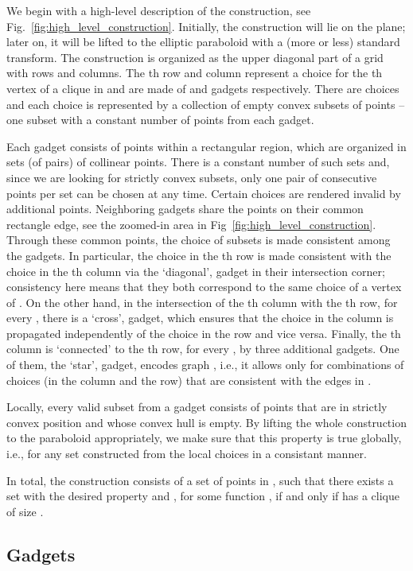 \documentclass[11pt,a4paper]{article}
\begin{document}
We begin with a high-level description of the construction, see Fig.~\ref{fig:high_level_construction}. Initially, the construction will lie on the plane; later on, it will be lifted to the elliptic paraboloid with a (more or less) standard transform. The construction is organized as the upper diagonal part of a grid with  rows and  columns. The th row and column represent a choice for the th vertex of a clique in  and are made of  and  gadgets respectively. There are  choices and each choice is represented by a collection of empty convex subsets of points -- one subset with a constant number of points from each gadget.

Each gadget consists of  points within a rectangular region, which are organized in sets (of pairs) of collinear points. There is a constant number of such sets and, since we are looking for strictly convex subsets, only one pair of consecutive points per set can be chosen at any time. Certain choices are rendered invalid by additional points. Neighboring gadgets share the points on their common rectangle edge, see the zoomed-in area in Fig~\ref{fig:high_level_construction}. Through these common points, the choice of subsets is made consistent among the gadgets. In particular, the choice in the th row is made consistent with the choice in the th column via the `diagonal',  gadget in their intersection corner; consistency here means that they both correspond to the same choice of a vertex of . On the other hand, in the intersection of the th column with the th row, for every , there is a `cross',  gadget, which ensures that the choice in the column is propagated independently of the choice in the row and vice versa. 
Finally, the th column is `connected' to the th row, for every , by three additional gadgets. One of them, the `star',  gadget, encodes graph , i.e., it allows only for combinations of choices (in the column and the row) that are consistent with the edges in .

Locally, every valid subset from a gadget consists of points that are in strictly convex position and whose convex hull is empty. By lifting the whole construction to the paraboloid appropriately, we make sure that this property is true globally, i.e., for any set constructed from the local choices in a consistant manner. 

In total, the construction consists of a set  of  points  in , such that there exists a set  with the desired property and , for some function , if and only if  has a clique of size .

\subsection{Gadgets}
\label{sec:gadgets}
\end{document}
